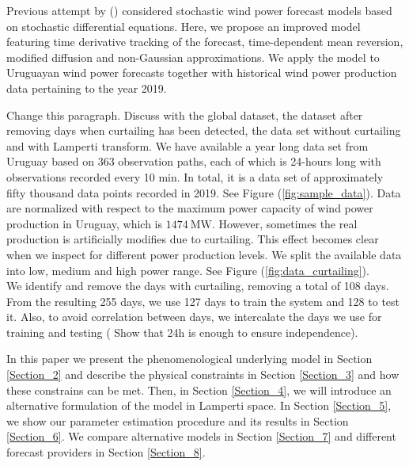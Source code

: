 \documentclass[11pt]{article}
\theoremstyle{definition}
\begin{document}
Previous attempt by (\cite{mozuma}) considered stochastic wind power forecast models based on stochastic differential equations. Here, we propose an improved model featuring time derivative tracking of the forecast, time-dependent mean reversion, modified diffusion and non-Gaussian approximations. We apply the model to Uruguayan wind power forecasts together with historical wind power production data pertaining to the year 2019.

{\color{red} Change this paragraph. Discuss with the global dataset, the dataset after removing days when curtailing has been detected, the data set without curtailing and with Lamperti transform.}
We have available a year long data set from Uruguay based on 363 observation paths, each of which is 24-hours long with observations recorded every 10 min. In total, it is a data set of approximately fifty thousand data points recorded in 2019. See Figure (\ref{fig:sample_data}). Data are normalized with respect to the maximum power capacity of wind power production in Uruguay, which is $\SI{1474}{\mega\watt}$. However, sometimes the real production is artificially modifies due to curtailing. This effect becomes clear when we inspect for different power production levels. We split the available data into low, medium and high power range. See Figure (\ref{fig:data_curtailing}).\\
We identify and remove the days with curtailing, removing a total of 108 days. From the resulting 255 days, we use 127 days to train the system and 128 to test it. Also, to avoid correlation between days, we intercalate the days we use for training and testing ({\color{red} Show that 24h is enough to ensure independence}).

In this paper we present the phenomenological underlying model in Section \ref{Section_2} and describe the physical constraints in Section \ref{Section_3} and how these constrains can be met. Then, in Section \ref{Section_4}, we will introduce an alternative formulation of the model in Lamperti space. In Section \ref{Section_5}, we show our parameter estimation procedure and its results in Section \ref{Section_6}. We compare alternative models in Section \ref{Section_7} and different forecast providers in Section \ref{Section_8}.
\end{document}
